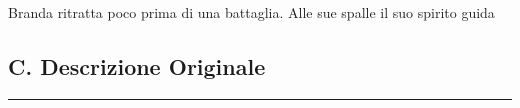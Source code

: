 Branda ritratta poco prima di una battaglia. Alle sue spalle il suo
spirito guida

\subsection{C. Descrizione Originale}\label{c.-descrizione-originale}

\begin{center}\rule{0.5\linewidth}{0.5pt}\end{center}
